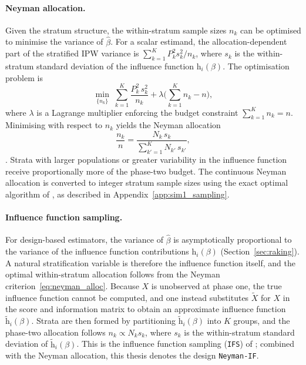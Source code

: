\paragraph{Neyman allocation.}
Given the stratum structure, the within-stratum sample sizes $n_k$ can be optimised to minimise the variance of $\hat{\beta}$. For a scalar estimand, the allocation-dependent part of the stratified IPW variance is $\sum_{k=1}^{K} P_k^2 s_k^2 / n_k$, where $s_k$ is the within-stratum standard deviation of the influence function $\mathrm{h}_i(\beta)$. The optimisation problem is
\begin{equation}
    \min_{\{n_k\}} \; \sum_{k=1}^{K} \frac{P_k^2\, s_k^2}{n_k} + \lambda \biggl( \sum_{k=1}^{K} n_k - n \biggr),
    \label{eq:neyman_lagrange}
\end{equation}
where $\lambda$ is a Lagrange multiplier enforcing the budget constraint $\sum_{k=1}^{K} n_k = n$. Minimising with respect to $n_k$ yields the Neyman allocation
\begin{equation}
    \frac{n_k}{n} = \frac{N_k\, s_k}{\sum_{k'=1}^{K} N_{k'}\, s_{k'}},
    \label{eq:neyman_alloc}
\end{equation}
\citep{neyman1938contribution}. Strata with larger populations or greater variability in the influence function receive proportionally more of the phase-two budget. The continuous Neyman allocation is converted to integer stratum sample sizes using the exact optimal algorithm of \citet{wright2017exact}, as described in Appendix~\ref{app:sim1_sampling}.

\paragraph{Influence function sampling.}
For design-based estimators, the variance of $\hat{\beta}$ is asymptotically proportional to the variance of the influence function contributions $\mathrm{h}_i(\beta)$ (Section~\ref{sec:raking}). A natural stratification variable is therefore the influence function itself, and the optimal within-stratum allocation follows from the Neyman criterion~\eqref{eq:neyman_alloc}. Because $X$ is unobserved at phase one, the true influence function cannot be computed, and one instead substitutes $\tilde{X}$ for $X$ in the score and information matrix to obtain an approximate influence function $\tilde{\mathrm{h}}_i(\beta)$. Strata are then formed by partitioning $\tilde{\mathrm{h}}_i(\beta)$ into $K$ groups, and the phase-two allocation follows $n_k \propto N_k s_k$, where $s_k$ is the within-stratum standard deviation of $\tilde{\mathrm{h}}_i(\beta)$. This is the influence function sampling (\texttt{IFS}) of \citet{amorim2021two}; combined with the Neyman allocation, this thesis denotes the design \texttt{Neyman-IF}.

